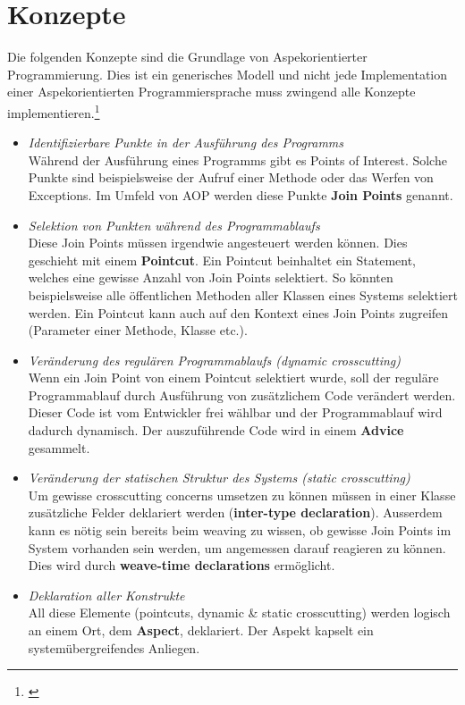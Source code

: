 \section{Konzepte}
\label{sec:aop_concepts}

Die folgenden Konzepte sind die Grundlage von Aspekorientierter Programmierung. Dies ist ein generisches Modell und nicht jede Implementation einer Aspekorientierten Programmiersprache muss zwingend alle Konzepte implementieren.\footnote{\cite[p~58]{laddad:aspectj}}

\begin{itemize}
\item \textit{Identifizierbare Punkte in der Ausführung des Programms} \\ Während der Ausführung eines Programms gibt es Points of Interest. Solche Punkte sind beispielsweise der Aufruf einer Methode oder das Werfen von Exceptions. Im Umfeld von AOP werden diese Punkte \textbf{Join Points} genannt. 
\item \textit{Selektion von Punkten während des Programmablaufs}\\ Diese Join Points müssen irgendwie angesteuert werden können. Dies geschieht mit einem \textbf{Pointcut}. Ein Pointcut beinhaltet ein Statement, welches eine gewisse Anzahl von Join Points selektiert. So könnten beispielsweise alle öffentlichen Methoden aller Klassen eines Systems selektiert werden. Ein Pointcut kann auch auf den Kontext eines Join Points zugreifen (Parameter einer Methode, Klasse etc.).
\item \textit{Veränderung des regulären Programmablaufs (dynamic crosscutting)}\\
Wenn ein Join Point von einem Pointcut selektiert wurde, soll der reguläre Programmablauf durch Ausführung von zusätzlichem Code verändert werden. Dieser Code ist vom Entwickler frei wählbar und der Programmablauf wird dadurch dynamisch. Der auszuführende Code wird in einem \textbf{Advice} gesammelt.
\item \textit{Veränderung der statischen Struktur des Systems (static crosscutting)}\\
Um gewisse crosscutting concerns umsetzen zu können müssen in einer Klasse zusätzliche Felder deklariert werden (\textbf{inter-type declaration}). Ausserdem kann es nötig sein bereits beim weaving zu wissen, ob gewisse Join Points im System vorhanden sein werden, um angemessen darauf reagieren zu können. Dies wird durch \textbf{weave-time declarations} ermöglicht.

\item \textit{Deklaration aller Konstrukte}\\
All diese Elemente (pointcuts, dynamic \& static crosscutting) werden logisch an einem Ort, dem \textbf{Aspect}, deklariert. Der Aspekt kapselt ein systemübergreifendes Anliegen. 
\end{itemize}

